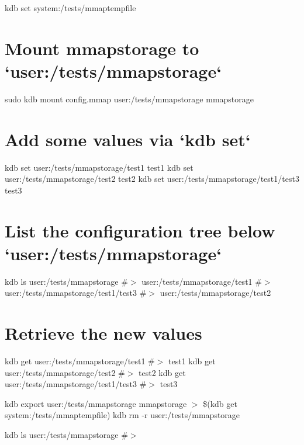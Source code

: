 kdb set system\+:/tests/mmaptempfile \hypertarget{autotoc_md411_autotoc_md424}{}\section{Mount mmapstorage to `user\+:/tests/mmapstorage`}\label{autotoc_md411_autotoc_md424}
sudo kdb mount config.\+mmap user\+:/tests/mmapstorage mmapstorage\hypertarget{autotoc_md411_autotoc_md425}{}\section{Add some values via `kdb set`}\label{autotoc_md411_autotoc_md425}
kdb set user\+:/tests/mmapstorage/test1 test1 kdb set user\+:/tests/mmapstorage/test2 test2 kdb set user\+:/tests/mmapstorage/test1/test3 test3\hypertarget{autotoc_md411_autotoc_md426}{}\section{List the configuration tree below `user\+:/tests/mmapstorage`}\label{autotoc_md411_autotoc_md426}
kdb ls user\+:/tests/mmapstorage \#$>$ user\+:/tests/mmapstorage/test1 \#$>$ user\+:/tests/mmapstorage/test1/test3 \#$>$ user\+:/tests/mmapstorage/test2\hypertarget{autotoc_md411_autotoc_md427}{}\section{Retrieve the new values}\label{autotoc_md411_autotoc_md427}
kdb get user\+:/tests/mmapstorage/test1 \#$>$ test1 kdb get user\+:/tests/mmapstorage/test2 \#$>$ test2 kdb get user\+:/tests/mmapstorage/test1/test3 \#$>$ test3

kdb export user\+:/tests/mmapstorage mmapstorage $>$ \$(kdb get system\+:/tests/mmaptempfile) kdb rm -\/r user\+:/tests/mmapstorage

kdb ls user\+:/tests/mmapstorage \#$>$

